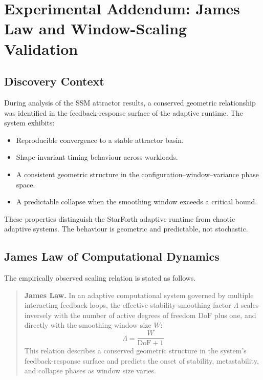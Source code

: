 
\section{Experimental Addendum: James Law and Window-Scaling Validation}
\label{sec:experimental-addendum}

\subsection{Discovery Context}

During analysis of the SSM attractor results, a conserved geometric
relationship was identified in the feedback-response surface of the
adaptive runtime. The system exhibits:

\begin{itemize}
  \item Reproducible convergence to a stable attractor basin.
  \item Shape-invariant timing behaviour across workloads.
  \item A consistent geometric structure in the configuration--window--variance
    phase space.
  \item A predictable collapse when the smoothing window exceeds a critical
    bound.
\end{itemize}

These properties distinguish the StarForth adaptive runtime from chaotic
adaptive systems. The behaviour is geometric and predictable, not
stochastic.

\subsection{James Law of Computational Dynamics}

The empirically observed scaling relation is stated as follows.

\begin{quote}
\textbf{James Law.} In an adaptive computational system governed by
multiple interacting feedback loops, the effective stability-smoothing
factor $\Lambda$ scales inversely with the number of active degrees of
freedom $\mathrm{DoF}$ plus one, and directly with the smoothing window
size $W$:
\[
  \Lambda = \frac{W}{\mathrm{DoF} + 1}
\]
This relation describes a conserved geometric structure in the system's
feedback-response surface and predicts the onset of stability,
metastability, and collapse phases as window size varies.
\end{quote}

